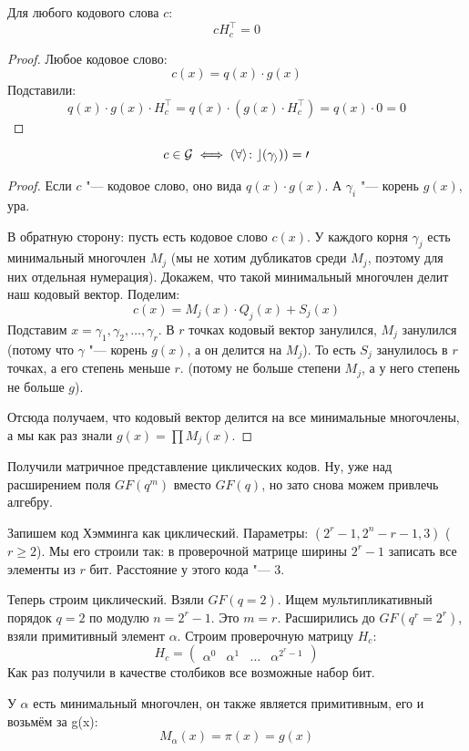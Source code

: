 \begin{lemma}
	Для любого кодового слова $c$:
	\[
	c H_c^\top = 0
	\]
\end{lemma}
\begin{proof}
	Любое кодовое слово:
	\[
	c(x) = q(x) \cdot g(x)
	\]
	Подставили:
	\[
	q(x) \cdot g(x) \cdot H_c^\top = q(x) \cdot (g(x) \cdot H_c^\top) = q(x) \cdot 0 = 0
	\]
\end{proof}
\begin{lemma}
	\[ c \in \cal G \iff (\forall i \colon c(\gamma_i)) = 0 \]
\end{lemma}
\begin{proof}
	Если $c$ "--- кодовое слово, оно вида $q(x) \cdot g(x)$.
	А $\gamma_i$ "--- корень $g(x)$, ура.

	В обратную сторону:
	пусть есть кодовое слово $c(x)$.
	У каждого корня $\gamma_j$ есть минимальный многочлен $M_j$ (мы не хотим дубликатов среди $M_j$,
	поэтому для них отдельная нумерация).
	Докажем, что такой минимальный многочлен делит наш кодовый вектор.
	Поделим:
	\[
	c(x) = M_j(x) \cdot Q_j(x) + S_j(x)
	\]
	Подставим $x=\gamma_1, \gamma_2, \dots, \gamma_r$.
	В $r$ точках кодовый вектор занулился,
	$M_j$ занулился (потому что $\gamma$ "--- корень $g(x)$, а он делится на $M_j$).
	То есть $S_j$ занулилось в $r$ точках, а его степень меньше $r$.
	(потому не больше степени $M_j$, а у него степень не больше $g$).

	Отсюда получаем, что кодовый вектор делится на все минимальные многочлены,
	а мы как раз знали $g(x)=\prod M_j(x)$.
\end{proof}

\begin{Rem}
	Получили матричное представление циклических кодов.
	Ну, уже над расширением поля $GF(q^m)$ вместо $GF(q)$,
	но зато снова можем привлечь алгебру.
\end{Rem}

\begin{Rem}
	Запишем код Хэмминга как циклический.
	Параметры: $(2^r-1,2^n-r-1,3)$ ($r \ge 2$).
	Мы его строили так: в проверочной матрице
	ширины $2^r-1$ записать все элементы из $r$ бит.
	Расстояние у этого кода "--- 3.

	Теперь строим циклический.
	Взяли $GF(q=2)$.
	Ищем мультипликативный порядок $q=2$ по модулю $n=2^r-1$.
	Это $m=r$.
	Расширились до $GF(q^r=2^r)$, взяли примитивный элемент $\alpha$.
	Строим проверочную матрицу $H_c$:
	\[
	H_c = \begin{pmatrix}
	\alpha^0 & \alpha^1 & \dots & \alpha^{2^r-1}
	\end{pmatrix}
	\]
	Как раз получили в качестве столбиков все возможные набор бит.

	У $\alpha$ есть минимальный многочлен, он также является примитивным,
	его и возьмём за g(x):
	\[
		M_\alpha(x) = \pi(x) = g(x)
	\]
\end{Rem}

